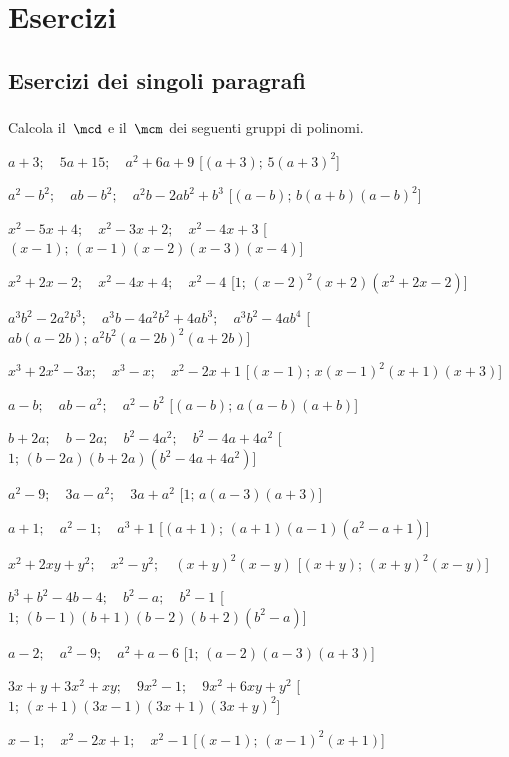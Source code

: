 
\section{Esercizi}

\subsection{Esercizi dei singoli paragrafi}

\subsubsection*{}

\begin{esercizio}[\Ast]
\label{ese:18.1}
Calcola il~$\mcd$ e il~$\mcm$ dei seguenti gruppi di polinomi.
\begin{enumeratea}
 \item $a+3;\quad 5a+15;\quad a^{2}+6a+9$
  \hfill [$(a+3);\,5(a+3)^2$]
 \item $a^{2}-b^{2};\quad ab-b^{2};\quad a^{2}b-2ab^{2}+b^{3}$
  \hfill [$(a-b);\,b(a+b)(a-b)^2$]
 \item $x^{2}-5x+4;\quad x^{2}-3x+2;\quad x^{2}-4x+3$
  \hfill [$(x-1);\,(x-1)(x-2)(x-3)(x-4)$]
 \item $x^{2}+2x-2;\quad x^{2}-4x+4;\quad x^{2}-4$
  \hfill [$1;\,(x-2)^2(x+2)\left(x^2+2x-2\right)$]
 \item $a^{3}b^{2}-2a^{2}b^{3};\quad a^{3}b-4a^{2}b^{2}+4ab^{3};
        \quad a^{3}b^{2}-4ab^{4}$
  \hfill [$ab(a-2b);\,a^2 b^2(a-2b)^2(a+2b)$]
 \item $x^{3}+2x^{2}-3x;\quad x^{3}-x;\quad x^{2}-2x+1$
  \hfill [$(x-1);\,x(x-1)^2(x+1)(x+3)$]
 \item $a-b;\quad ab-a^{2};\quad a^{2}-b^{2}$
  \hfill [$(a-b);\,a(a-b)(a+b)$]
 \item $b+2a;\quad b-2a;\quad b^{2}-4a^{2};\quad b^{2}-4a+4a^{2}$
  \hfill [$1;\,(b-2a)(b+2a)\left(b^2-4a+4a^2\right)$]
 \item $a^{2}-9;\quad 3a-a^{2};\quad 3a+a^{2}$
  \hfill [$1;\,a(a-3)(a+3)$]
 \item $a+1;\quad a^{2}-1;\quad a^{3}+1$
  \hfill [$(a+1);\,(a+1)(a-1)\left(a^2-a+1\right)$]
 \item $x^{2}+2xy+y^{2};\quad x^{2}-y^{2};\quad (x+y)^{2}(x-y)$
  \hfill [$(x+y);\,(x+y)^2(x-y)$]
 \item $b^{3}+b^{2}-4b-4;\quad b^{2}-a;\quad b^{2}-1$
  \hfill [$1;\,(b-1)(b+1)(b-2)(b+2)\left(b^2-a\right)$]
 \item $a-2;\quad a^{2}-9;\quad a^{2}+a-6$
  \hfill [$1;\,(a-2)(a-3)(a+3)$]
 \item $3x+y+3x^{2}+xy;\quad 9x^{2}-1;\quad 9x^{2}+6xy+y^{2}$
  \hfill [$1;\,(x+1)(3x-1)(3x+1)(3x+y)^2$]
 \item $x-1;\quad x^{2}-2x+1;\quad x^{2}-1$%
  \hfill [$(x-1);\,(x-1)^2(x+1)$]
\end{enumeratea}
\end{esercizio}

